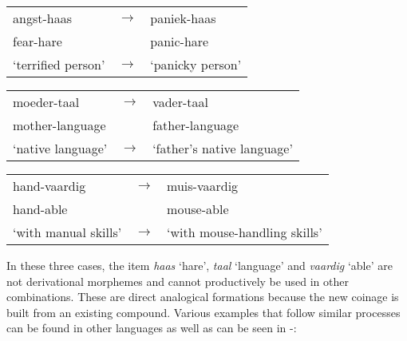 
\begin{exe}
    \ex \label{exe-dutch-analogies}
    \begin{xlist}
        \ex
        \begin{tabular}[t]{lcl}
          angst-haas           & $\rightarrow$ & paniek-haas                  \\
          fear-hare            &               & panic-hare                   \\
          `terrified person'   & $\rightarrow$ & `panicky person'             \\
        \end{tabular}
        \ex
        \begin{tabular}[t]{lcl}
          moeder-taal          & $\rightarrow$ & vader-taal                   \\
          mother-language      &               & father-language              \\
          `native language'    & $\rightarrow$ & `father's native language'  \\
        \end{tabular}
        \ex
        \begin{tabular}[t]{lcl}
          hand-vaardig         & $\rightarrow$ & muis-vaardig                 \\
          hand-able            &               & mouse-able                   \\
          `with manual skills' & $\rightarrow$ & `with mouse-handling skills' \\
        \end{tabular}
    \end{xlist}
\end{exe}

In these three cases, the item \textit{haas} `hare', \textit{taal} `language' and \textit{vaardig} `able' are not derivational morphemes and cannot productively be used in other combinations. These are direct analogical formations because the new coinage is built from an existing compound. Various examples that follow similar processes can be found in other languages as well as can be seen in -:


